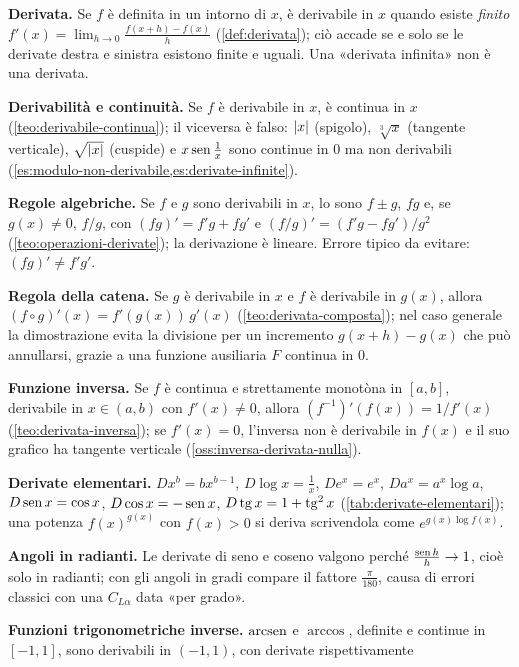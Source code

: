 \begin{puntichiave}
\item \textbf{Derivata.} Se $f$ è definita in un intorno di $x$, è derivabile in $x$ quando
esiste \emph{finito} $f'(x)=\lim_{h\to0}\frac{f(x+h)-f(x)}{h}$ (\cref{def:derivata}); ciò
accade se e solo se le derivate destra e sinistra esistono finite e uguali. Una
«derivata infinita» non è una derivata.
\item \textbf{Derivabilità e continuità.} Se $f$ è derivabile in $x$, è continua in $x$
(\cref{teo:derivabile-continua}); il viceversa è falso: $\lvert x\rvert$ (spigolo), $\sqrt[3]x$
(tangente verticale), $\sqrt{\lvert x\rvert}$ (cuspide) e $x\operatorname{sen}\frac1x$ sono continue in $0$ ma
non derivabili (\cref{es:modulo-non-derivabile,es:derivate-infinite}).
\item \textbf{Regole algebriche.} Se $f$ e $g$ sono derivabili in $x$, lo sono $f\pm g$,
$fg$ e, se $g(x)\neq0$, $f/g$, con $(fg)'=f'g+fg'$ e
$(f/g)'=(f'g-fg')/g^{2}$ (\cref{teo:operazioni-derivate}); la derivazione è lineare.
Errore tipico da evitare: $(fg)'\neq f'g'$.
\item \textbf{Regola della catena.} Se $g$ è derivabile in $x$ e $f$ è derivabile in
$g(x)$, allora $(f\circ g)'(x)=f'(g(x))\,g'(x)$ (\cref{teo:derivata-composta}); nel caso
generale la dimostrazione evita la divisione per un incremento $g(x+h)-g(x)$ che può
annullarsi, grazie a una funzione ausiliaria $F$ continua in $0$.
\item \textbf{Funzione inversa.} Se $f$ è continua e strettamente monotòna in $[a,b]$,
derivabile in $x\in(a,b)$ con $f'(x)\neq0$, allora $(f^{-1})'(f(x))=1/f'(x)$
(\cref{teo:derivata-inversa}); se $f'(x)=0$, l'inversa non è derivabile in $f(x)$ e il
suo grafico ha tangente verticale (\cref{oss:inversa-derivata-nulla}).
\item \textbf{Derivate elementari.} $Dx^{b}=bx^{b-1}$, $D\log x=\frac1x$, $De^{x}=e^{x}$,
$Da^{x}=a^{x}\log a$, $D\operatorname{sen} x=\cos x$, $D\cos x=-\operatorname{sen} x$, $D\operatorname{tg} x=1+\operatorname{tg}^{2}x$
(\cref{tab:derivate-elementari}); una potenza $f(x)^{g(x)}$ con $f(x)>0$ si deriva
scrivendola come $e^{g(x)\log f(x)}$.
\item \textbf{Angoli in radianti.} Le derivate di seno e coseno valgono perché
$\frac{\operatorname{sen} h}{h}\to1$, cioè solo in radianti; con gli angoli in gradi compare il fattore
$\frac{\pi}{180}$, causa di errori classici con una $C_{L\alpha}$ data «per grado».
\item \textbf{Funzioni trigonometriche inverse.} $\operatorname{arcsen}$ e $\arccos$, definite e
continue in $[-1,1]$, sono derivabili in $(-1,1)$, con derivate rispettivamente

\end{puntichiave}
